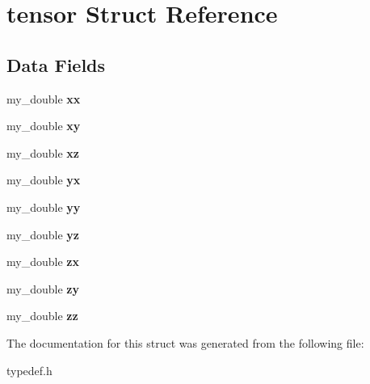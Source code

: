 \hypertarget{structtensor}{\section{tensor Struct Reference}
\label{structtensor}
}
\subsection*{Data Fields}
\begin{DoxyCompactItemize}
\item 
\hypertarget{structtensor_ad18cbcd9742016e1f825c892f9946135}{my\-\_\-double {\bfseries xx}}\label{structtensor_ad18cbcd9742016e1f825c892f9946135}

\item 
\hypertarget{structtensor_ae1595035559b4aff6a3a5ee296ce41d2}{my\-\_\-double {\bfseries xy}}\label{structtensor_ae1595035559b4aff6a3a5ee296ce41d2}

\item 
\hypertarget{structtensor_a122ac07f06127f6608cc51ed35d96fe1}{my\-\_\-double {\bfseries xz}}\label{structtensor_a122ac07f06127f6608cc51ed35d96fe1}

\item 
\hypertarget{structtensor_a3248f5ed05893ed6b1b9800929077e78}{my\-\_\-double {\bfseries yx}}\label{structtensor_a3248f5ed05893ed6b1b9800929077e78}

\item 
\hypertarget{structtensor_addd46fa80ab6830dead54b7ac769ac6f}{my\-\_\-double {\bfseries yy}}\label{structtensor_addd46fa80ab6830dead54b7ac769ac6f}

\item 
\hypertarget{structtensor_a51cae96829913ef76e6bff5b9db31357}{my\-\_\-double {\bfseries yz}}\label{structtensor_a51cae96829913ef76e6bff5b9db31357}

\item 
\hypertarget{structtensor_a8e4c27d388303c594b6e15ad220fde3a}{my\-\_\-double {\bfseries zx}}\label{structtensor_a8e4c27d388303c594b6e15ad220fde3a}

\item 
\hypertarget{structtensor_aa46ba06bc2156be46be941162f0849bf}{my\-\_\-double {\bfseries zy}}\label{structtensor_aa46ba06bc2156be46be941162f0849bf}

\item 
\hypertarget{structtensor_a17adccdc3d6454ead276968923162d3d}{my\-\_\-double {\bfseries zz}}\label{structtensor_a17adccdc3d6454ead276968923162d3d}

\end{DoxyCompactItemize}


The documentation for this struct was generated from the following file\-:\begin{DoxyCompactItemize}
\item 
typedef.\-h\end{DoxyCompactItemize}

